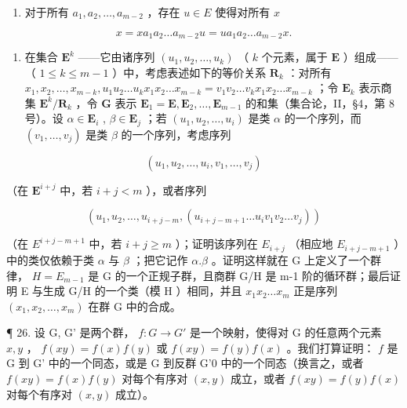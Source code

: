 \begin{enumerate}
\def\labelenumi{(\alph{enumi})}
\setcounter{enumi}{1}
\tightlist
\item
  对于所有 \(a_1, a_2, \ldots, a_{m-2}\) ，存在 \(u \in E\) 使得对所有 \(x\)
\end{enumerate}

\[
x = x a _ {1} a _ {2} \dots a _ {m - 2} u = u a _ {1} a _ {2} \dots a _ {m - 2} x.
\]

\begin{enumerate}
\def\labelenumi{(\alph{enumi})}
\setcounter{enumi}{2}
\tightlist
\item
  在集合 \(\mathbf{E}^k\) ——它由诸序列 \((u_1, u_2, \ldots, u_k)\) （ \(k\) 个元素，属于 \(\mathbf{E}\) ）组成——（ \(1 \leqslant k \leqslant m - 1\) ）中，考虑表述如下的等价关系 \(\mathbf{R}_k\) ：对所有 \(x_1, x_2, \ldots, x_{m-k}, u_1 u_2 \ldots u_k x_1 x_2 \ldots x_{m-k} = v_1 v_2 \ldots v_k x_1 x_2 \ldots x_{m-k}\) ；令 \(\mathbf{E}_k\) 表示商集 \(\mathbf{E}^k / \mathbf{R}_k\) ，令 \(\mathbf{G}\) 表示 \(\mathbf{E}_1 = \mathbf{E}, \mathbf{E}_2, \ldots, \mathbf{E}_{m-1}\) 的和集（集合论，II，§4，第 8 号）。设 \(\alpha \in \mathbf{E}_i\) , \(\beta \in \mathbf{E}_j\) ；若 \((u_1, u_2, \ldots, u_i)\) 是类 \(\alpha\) 的一个序列，而 \((v_1, \ldots, v_j)\) 是类 \(\beta\) 的一个序列，考虑序列
\end{enumerate}

\[
\left(u _ {1}, u _ {2}, \dots , u _ {i}, v _ {1}, \dots , v _ {j}\right)
\]

（在 \(\mathbf{E}^{i + j}\) 中，若 \(i + j < m\) ），或者序列

\[
\left(u _ {1}, u _ {2}, \dots , u _ {i + j - m}, \left(u _ {i + j - m + 1} \dots u _ {i} v _ {1} v _ {2} \dots v _ {j}\right)\right)
\]

（在 \(E^{i+j-m+1}\) 中，若 \(i+j\geqslant m\) ）；证明该序列在 \(E_{i+j}\) （相应地 \(E_{i+j-m+1}\) ）中的类仅依赖于类 \(\alpha\) 与 \(\beta\) ；把它记作 \(\alpha.\beta\) 。证明这样就在 G 上定义了一个群律， \(H=E_{m-1}\) 是 G 的一个正规子群，且商群 G/H 是 m-1 阶的循环群；最后证明 E 与生成 G/H 的一个类（模 H ）相同，并且 \(x_{1}x_{2}\ldots x_{m}\) 正是序列 \((x_{1},x_{2},\ldots,x_{m})\) 在群 G 中的合成。

¶ 26. 设 G, G' 是两个群， \(f: G \to G'\) 是一个映射，使得对 G 的任意两个元素 \(x, y\) ， \(f(xy) = f(x)f(y)\) 或 \(f(xy) = f(y)f(x)\) 。我们打算证明： \(f\) 是 G 到 G' 中的一个同态，或是 G 到反群 G'0 中的一个同态（换言之，或者 \(f(xy) = f(x)f(y)\) 对每个有序对 \((x, y)\) 成立，或者 \(f(xy) = f(y)f(x)\) 对每个有序对 \((x, y)\) 成立）。

